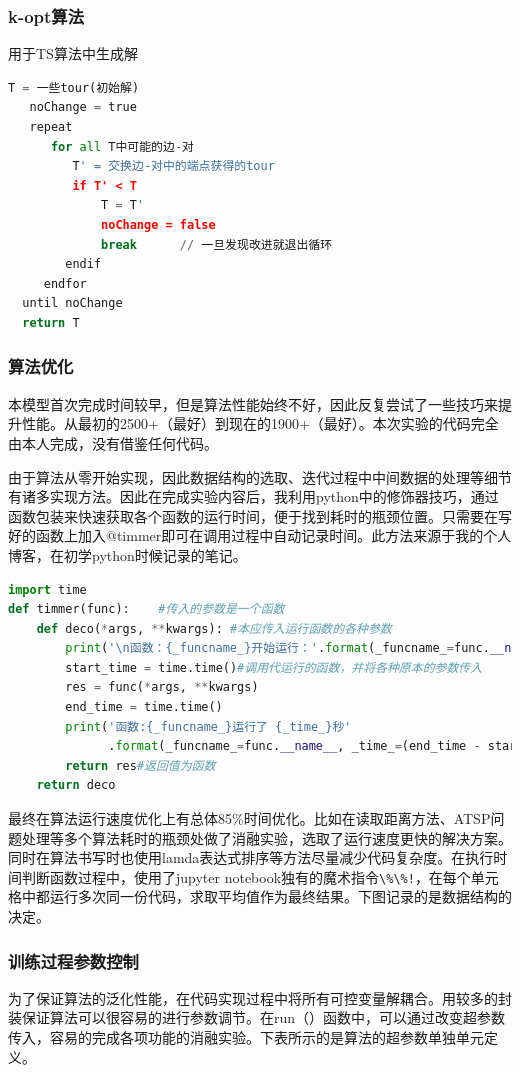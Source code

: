 \documentclass[lang=cn,11pt]{elegantpaper}
\begin{document}
\subsubsection{k-opt算法}
用于TS算法中生成解
\begin{lstlisting}[language=python]
   T = 一些tour(初始解)
   noChange = true
   repeat
      for all T中可能的边-对
         T' = 交换边-对中的端点获得的tour
         if T' < T
             T = T'
             noChange = false
             break      // 一旦发现改进就退出循环
        endif
     endfor
  until noChange
  return T
\end{lstlisting}

\subsubsection{算法优化}
本模型首次完成时间较早，但是算法性能始终不好，因此反复尝试了一些技巧来提升性能。从最初的2500+（最好）到现在的1900+（最好）。本次实验的代码完全由本人完成，没有借鉴任何代码。

由于算法从零开始实现，因此数据结构的选取、迭代过程中中间数据的处理等细节有诸多实现方法。因此在完成实验内容后，我利用python中的修饰器技巧，通过函数包装来快速获取各个函数的运行时间，便于找到耗时的瓶颈位置。只需要在写好的函数上加入@timmer即可在调用过程中自动记录时间。此方法来源于我的个人博客，在初学python时候记录的笔记。

\begin{lstlisting}[language=python]
import time
def timmer(func):    #传入的参数是一个函数
    def deco(*args, **kwargs): #本应传入运行函数的各种参数
        print('\n函数：{_funcname_}开始运行：'.format(_funcname_=func.__name__))
        start_time = time.time()#调用代运行的函数，并将各种原本的参数传入
        res = func(*args, **kwargs)
        end_time = time.time()
        print('函数:{_funcname_}运行了 {_time_}秒'
              .format(_funcname_=func.__name__, _time_=(end_time - start_time)))
        return res#返回值为函数
    return deco
\end{lstlisting}
最终在算法运行速度优化上有总体85\%时间优化。比如在读取距离方法、ATSP问题处理等多个算法耗时的瓶颈处做了消融实验，选取了运行速度更快的解决方案。同时在算法书写时也使用lamda表达式排序等方法尽量减少代码复杂度。在执行时间判断函数过程中，使用了jupyter notebook独有的魔术指令\lstinline{\%\%!}，在每个单元格中都运行多次同一份代码，求取平均值作为最终结果。下图记录的是数据结构的决定。

\subsubsection{训练过程参数控制}
为了保证算法的泛化性能，在代码实现过程中将所有可控变量解耦合。用较多的封装保证算法可以很容易的进行参数调节。在run（）函数中，可以通过改变超参数传入，容易的完成各项功能的消融实验。下表所示的是算法的超参数单独单元定义。
\end{document}
